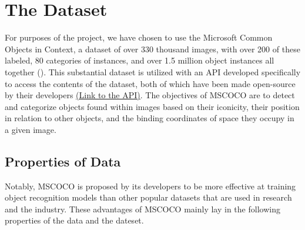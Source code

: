 \section{The Dataset}

For purposes of the project, we have chosen to use the Microsoft Common Objects in Context, a dataset of over 330 thousand images, with over 200 of these labeled, 80 categories of instances, and over 1.5 million object instances all together (). This substantial dataset is utilized with an API developed specifically to access the contents of the dataset, both of which have been made open-source by their developers \href{https://github.com/cocodataset/cocoapi}{(Link to the API)}. The objectives of MSCOCO are to detect and categorize objects found within images based on their iconicity, their position in relation to other objects, and the binding coordinates of space they occupy in a given image. 


\subsection{Properties of Data}
Notably, MSCOCO is proposed by its developers to be more effective at training object recognition models than other popular datasets that are used in research and the industry. These advantages of MSCOCO mainly lay in the following properties of the data and the dateset.


